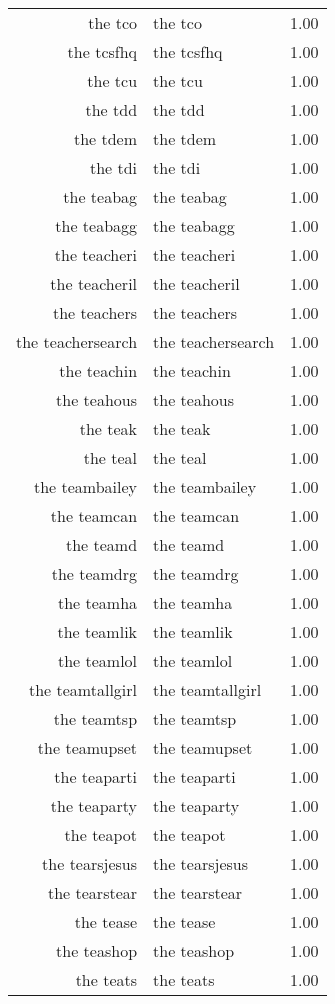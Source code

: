 \begin{table}[ht]
\begin{tabular}{rlr}
  the tco & the tco & 1.00 \\ 
  the tcsfhq & the tcsfhq & 1.00 \\ 
  the tcu & the tcu & 1.00 \\ 
  the tdd & the tdd & 1.00 \\ 
  the tdem & the tdem & 1.00 \\ 
  the tdi & the tdi & 1.00 \\ 
  the teabag & the teabag & 1.00 \\ 
  the teabagg & the teabagg & 1.00 \\ 
  the teacheri & the teacheri & 1.00 \\ 
  the teacheril & the teacheril & 1.00 \\ 
  the teachers & the teachers & 1.00 \\ 
  the teachersearch & the teachersearch & 1.00 \\ 
  the teachin & the teachin & 1.00 \\ 
  the teahous & the teahous & 1.00 \\ 
  the teak & the teak & 1.00 \\ 
  the teal & the teal & 1.00 \\ 
  the teambailey & the teambailey & 1.00 \\ 
  the teamcan & the teamcan & 1.00 \\ 
  the teamd & the teamd & 1.00 \\ 
  the teamdrg & the teamdrg & 1.00 \\ 
  the teamha & the teamha & 1.00 \\ 
  the teamlik & the teamlik & 1.00 \\ 
  the teamlol & the teamlol & 1.00 \\ 
  the teamtallgirl & the teamtallgirl & 1.00 \\ 
  the teamtsp & the teamtsp & 1.00 \\ 
  the teamupset & the teamupset & 1.00 \\ 
  the teaparti & the teaparti & 1.00 \\ 
  the teaparty & the teaparty & 1.00 \\ 
  the teapot & the teapot & 1.00 \\ 
  the tearsjesus & the tearsjesus & 1.00 \\ 
  the tearstear & the tearstear & 1.00 \\ 
  the tease & the tease & 1.00 \\ 
  the teashop & the teashop & 1.00 \\ 
  the teats & the teats & 1.00 \\ 

\end{tabular}
\end{table}
